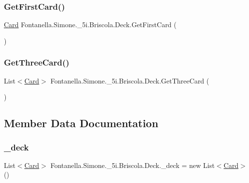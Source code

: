 \subsubsection{\texorpdfstring{Get\+First\+Card()}{GetFirstCard()}}
{\footnotesize\ttfamily \hyperlink{class_fontanella_1_1_simone_1_1__5i_1_1_briscola_1_1_card}{Card} Fontanella.\+Simone.\+\_\+5i.\+Briscola.\+Deck.\+Get\+First\+Card (\begin{DoxyParamCaption}{ }\end{DoxyParamCaption})}

\hypertarget{class_fontanella_1_1_simone_1_1__5i_1_1_briscola_1_1_deck_a6f7eeeefb6eb39856f371d3472ab68a6}{}\label{class_fontanella_1_1_simone_1_1__5i_1_1_briscola_1_1_deck_a6f7eeeefb6eb39856f371d3472ab68a6} 
\subsubsection{\texorpdfstring{Get\+Three\+Card()}{GetThreeCard()}}
{\footnotesize\ttfamily List$<$\hyperlink{class_fontanella_1_1_simone_1_1__5i_1_1_briscola_1_1_card}{Card}$>$ Fontanella.\+Simone.\+\_\+5i.\+Briscola.\+Deck.\+Get\+Three\+Card (\begin{DoxyParamCaption}{ }\end{DoxyParamCaption})}



\subsection{Member Data Documentation}
\hypertarget{class_fontanella_1_1_simone_1_1__5i_1_1_briscola_1_1_deck_a5dc9a572ca0d289f9726513ecdaf5203}{}\label{class_fontanella_1_1_simone_1_1__5i_1_1_briscola_1_1_deck_a5dc9a572ca0d289f9726513ecdaf5203} 
\subsubsection{\texorpdfstring{\+\_\+deck}{\_deck}}
{\footnotesize\ttfamily List$<$\hyperlink{class_fontanella_1_1_simone_1_1__5i_1_1_briscola_1_1_card}{Card}$>$ Fontanella.\+Simone.\+\_\+5i.\+Briscola.\+Deck.\+\_\+deck = new List$<$\hyperlink{class_fontanella_1_1_simone_1_1__5i_1_1_briscola_1_1_card}{Card}$>$()}

